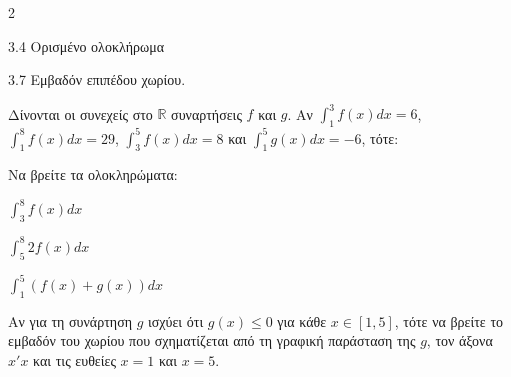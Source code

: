 \begin{ylh}{2}
    \item 3.4 Ορισμένο ολοκλήρωμα
    \item 3.7 Εμβαδόν επιπέδου χωρίου.
\end{ylh}
Δίνονται οι συνεχείς στο $\mathbb{R}$ συναρτήσεις $f$ και $g$.
Αν $\int_{1}^{3} f(x)dx = 6$, $\int_{1}^{8} f(x)dx = 29$, $\int_{3}^{5} f(x)dx = 8$ και $\int_{1}^{5} g(x)dx = -6$, τότε:
\begin{alist}
\item Να βρείτε τα ολοκληρώματα:
\begin{rlist}
\item $\int_{3}^{8} f(x)dx$
\item $\int_{5}^{8} 2f(x)dx$
\item $\int_{1}^{5} (f(x) + g(x))dx$
\end{rlist} 
\item Αν για τη συνάρτηση $g$ ισχύει ότι $g(x) \le 0$ για κάθε $x \in [1,5]$, τότε να βρείτε το εμβαδόν του χωρίου που σχηματίζεται από τη γραφική παράσταση της $g$, τον άξονα $x'x$ και τις ευθείες $x=1$ και $x=5$. 
\end{alist}